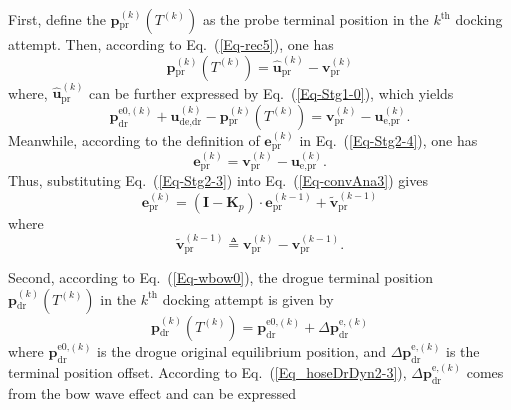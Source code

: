 \label{App-1}First, define the $\mathbf{p}{_{\text{pr}}^{\left(k\right)}}\left(T^{\left(k\right)}\right)$
as the probe terminal position in the $k^{\text{th}}$ docking attempt.
Then, according to Eq.~(\ref{Eq-rec5}), one has
\begin{equation}
\mathbf{p}{_{\text{pr}}^{\left(k\right)}}\left(T^{\left(k\right)}\right)=\mathbf{\hat{u}}_{\text{pr}}^{\left(k\right)}-\mathbf{v}_{\text{pr}}^{\left(k\right)}\label{Eq-convAna1}
\end{equation}
where, $\mathbf{\hat{u}}_{\text{pr}}^{\left(k\right)}$ can be further
expressed by Eq.~(\ref{Eq-Stg1-0}), which yields 
\begin{equation}
{\mathbf{p}}_{\text{dr}}^{\text{e0,}\left(k\right)}+\mathbf{u}_{\text{de,dr}}^{\left(k\right)}-\mathbf{p}{_{\text{pr}}^{\left(k\right)}}\left(T^{\left(k\right)}\right)=\mathbf{v}_{\text{pr}}^{\left(k\right)}-\mathbf{u}_{\text{e,pr}}^{\left(k\right)}.\label{Eq-convAna2}
\end{equation}
Meanwhile, according to the definition of $\mathbf{e}_{\text{pr}}^{(k)}$
in Eq.~(\ref{Eq-Stg2-4}), one has
\begin{equation}
\mathbf{e}_{\text{pr}}^{(k)}=\mathbf{v}_{\text{pr}}^{\left(k\right)}-\mathbf{u}_{\text{e,pr}}^{\left(k\right)}.\label{Eq-convAna3}
\end{equation}
Thus, substituting Eq.\ (\ref{Eq-Stg2-3}) into Eq.~(\ref{Eq-convAna3})
gives
\begin{equation}
\mathbf{e}_{\text{pr}}^{(k)}=\left(\mathbf{I}-\mathbf{K}_{p}\right)\cdot\mathbf{e}_{\text{pr}}^{(k-1)}+\mathbf{\tilde{v}}_{\text{pr}}^{\left(k-1\right)}\label{Eq-convAna6}
\end{equation}
where
\begin{equation}
\mathbf{\tilde{v}}_{\text{pr}}^{\left(k-1\right)}\triangleq\mathbf{v}_{\text{pr}}^{\left(k\right)}-\mathbf{v}_{\text{pr}}^{\left(k-1\right)}.\label{eq:Vpr}
\end{equation}

Second, according to Eq.~(\ref{Eq-wbow0}), the drogue terminal position
$\mathbf{p}{_{\text{dr}}^{(k)}}\left(T^{\left(k\right)}\right)$ in
the $k^{\text{th}}$ docking attempt is given by
\begin{equation}
\mathbf{p}{_{\text{dr}}^{(k)}}\left(T^{\left(k\right)}\right)={\mathbf{p}}_{\text{dr}}^{\text{e0,}\left(k\right)}+\Delta{\mathbf{p}}_{\text{dr}}^{\text{e,}\left(k\right)}\label{Eq-convAna8}
\end{equation}
where ${\mathbf{p}}_{\text{dr}}^{\text{e0,}\left(k\right)}$ is the
drogue original equilibrium position, and $\Delta{\mathbf{p}}_{\text{dr}}^{\text{e,}\left(k\right)}$
is the terminal position offset. According to Eq.~(\ref{Eq_hoseDrDyn2-3}),
$\Delta{\mathbf{p}}_{\text{dr}}^{\text{e,}\left(k\right)}$ comes
from the bow wave effect and can be expressed

